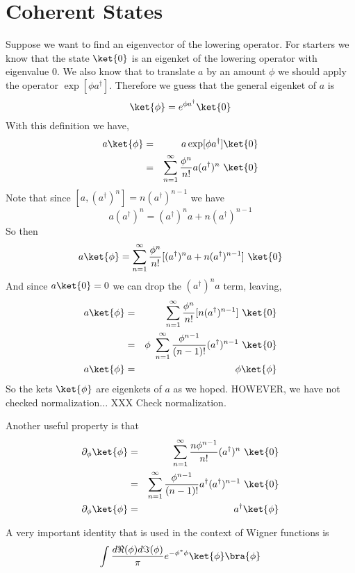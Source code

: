 \section{Coherent States}

Suppose we want to find an eigenvector of the lowering operator. For starters we know that the state $\ket{0}$ is an eigenket of the lowering operator with eigenvalue $0$. We also know that to translate $a$ by an amount $\phi$ we should apply the operator $\exp[\phi a^{\dagger}]$. Therefore we guess that the general eigenket of $a$ is \begin{equation}
\ket{\phi}=e^{\phi a^{\dagger}}\ket{0} \end{equation}
With this definition we have, \begin{eqnarray*}
a\ket{\phi} & = & a\exp[\phi a^{\dagger}]\ket{0}\\
& = & \sum_{n=1}^{\infty}\frac{\phi^{n}}{n!}a(a^{\dagger})^{n}~\ket{0}\end{eqnarray*}
Note that since $[a,(a^{\dagger})^{n}]=n(a^{\dagger})^{n-1}$ we have \begin{equation}
a(a^{\dagger})^{n}=(a^{\dagger})^{n}a+n(a^{\dagger})^{n-1} \end{equation}
So then \begin{equation}
a\ket{\phi}=\sum_{n=1}^{\infty}\frac{\phi^{n}}{n!}[(a^{\dagger})^{n}a+n(a^{\dagger})^{n-1}]~\ket{0} \end{equation}
And since $a\ket{0}=0$ we can drop the $(a^{\dagger})^{n}a$ term, leaving, \begin{eqnarray*}
a\ket{\phi} & = & \sum_{n=1}^{\infty}\frac{\phi^{n}}{n!}[n(a^{\dagger})^{n-1}]~\ket{0}\\
& = & \phi~\sum_{n=1}^{\infty}\frac{\phi^{n-1}}{(n-1)!}(a^{\dagger})^{n-1}~\ket{0}\\
a\ket{\phi} & = & \phi\ket{\phi}\end{eqnarray*}
So the kets $\ket{\phi}$ are eigenkets of $a$ as we hoped.
HOWEVER, we have not checked normalization...
XXX Check normalization.

Another useful property is that \begin{eqnarray*}
\partial_{\phi}\ket{\phi} & = & \sum_{n=1}^{\infty}\frac{n\phi^{n-1}}{n!}(a^{\dagger})^{n}~\ket{0} \\
& = & \sum_{n=1}^{\infty}\frac{\phi^{n-1}}{(n-1)!}a^{\dagger}(a^{\dagger})^{n-1}~\ket{0}\\
\partial_{\phi}\ket{\phi} & = & a^{\dagger}\ket{\phi}\end{eqnarray*}


A very important identity that is used in the context of Wigner functions
is \begin{equation}
\int\frac{d\Re(\phi)d\Im(\phi)}{\pi}e^{-\phi^{*}\phi}\ket{\phi}\bra{\phi} \end{equation}

